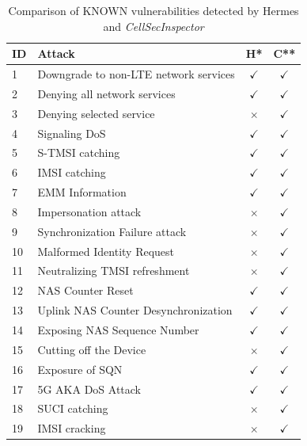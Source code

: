 \documentclass[sigconf]{acmart}
\newcommand{\cmark}{$\checkmark$}
\newcommand{\xmark}{$\times$}
\newcommand{\lm}{\textit{CellSecInspector}\xspace}
\begin{document}
{\begin{table}[ht]
\centering
\caption{Comparison of KNOWN vulnerabilities detected by Hermes and \lm}
\vspace{-0.1in}
\label{tab:vulnerabilities}
\scriptsize
\begin{tabularx}{\linewidth}{p{.1cm} p{5.7cm} c c}
\toprule
\textbf{ID} & \textbf{Attack} & \textbf{H*} & \textbf{C**} \\
\midrule
1 & Downgrade to non-LTE network services \cite{shaik2015practical} & \cmark & \cmark \\
2 & Denying all network services \cite{shaik2015practical} & \cmark & \cmark \\
3 & Denying selected service \cite{shaik2015practical} & \xmark & \cmark \\
4 & Signaling DoS \cite{6550445, kambourakis2011attacks, lee2009detection, leong2014unveiling} & \cmark & \cmark \\
5 & S-TMSI catching \cite{kim2019touching}& \cmark & \cmark \\
6 & IMSI catching\cite{van2015defeating}& \cmark & \cmark \\
7 & EMM Information \cite{park2016white}& \cmark & \cmark \\
8 & Impersonation attack \cite{chlosta2019lte} & \xmark & \cmark \\
9 & Synchronization Failure attack \cite{8958725} & \xmark & \cmark \\
10 & Malformed Identity Request \cite{michau2016not} & \xmark & \cmark \\
11 & Neutralizing TMSI refreshment \cite{hussain20195greasoner} & \xmark & \cmark \\
12 & NAS Counter Reset \cite{hussain20195greasoner} & \cmark & \cmark \\
13 & Uplink NAS Counter Desynchronization \cite{hussain20195greasoner} & \cmark & \cmark \\
14 & Exposing NAS Sequence Number \cite{hussain20195greasoner} & \cmark & \cmark \\
15 & Cutting off the Device \cite{hussain20195greasoner} & \xmark & \cmark \\
16 & Exposure of SQN \cite{borgaonkar2018new} & \cmark & \cmark \\
17 & 5G AKA DoS Attack\cite{8894379} & \cmark & \cmark \\
18 & SUCI catching \cite{chlosta20215g} & \xmark & \cmark \\
19 & IMSI cracking \cite{hussain2019privacy} & \xmark & \cmark \\

\end{tabularx}
\end{table}}
\end{document}
